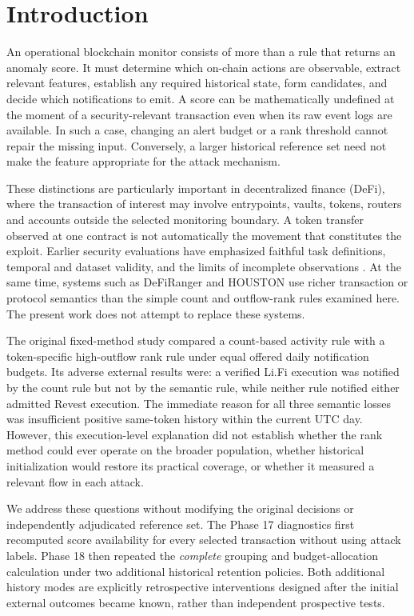 \documentclass[preprint,12pt,authoryear]{elsarticle}
\begin{document}
\section{Introduction}\label{introduction}

An operational blockchain monitor consists of more than a rule that returns an anomaly score. It must determine which on-chain actions are observable, extract relevant features, establish any required historical state, form candidates, and decide which notifications to emit. A score can be mathematically undefined at the moment of a security-relevant transaction even when its raw event logs are available. In such a case, changing an alert budget or a rank threshold cannot repair the missing input. Conversely, a larger historical reference set need not make the feature appropriate for the attack mechanism.

These distinctions are particularly important in decentralized finance (DeFi), where the transaction of interest may involve entrypoints, vaults, tokens, routers and accounts outside the selected monitoring boundary. A token transfer observed at one contract is not automatically the movement that constitutes the exploit. Earlier security evaluations have emphasized faithful task definitions, temporal and dataset validity, and the limits of incomplete observations \citep{Sommer2010ClosedWorld,Arp2022Dons}. At the same time, systems such as DeFiRanger and HOUSTON use richer transaction or protocol semantics than the simple count and outflow-rank rules examined here. The present work does not attempt to replace these systems.

The original fixed-method study compared a count-based activity rule with a token-specific high-outflow rank rule under equal offered daily notification budgets. Its adverse external results were: a verified Li.Fi execution was notified by the count rule but not by the semantic rule, while neither rule notified either admitted Revest execution. The immediate reason for all three semantic losses was insufficient positive same-token history within the current UTC day. However, this execution-level explanation did not establish whether the rank method could ever operate on the broader population, whether historical initialization would restore its practical coverage, or whether it measured a relevant flow in each attack.

We address these questions without modifying the original decisions or independently adjudicated reference set. The Phase 17 diagnostics first recomputed score availability for every selected transaction without using attack labels. Phase 18 then repeated the \emph{complete} grouping and budget-allocation calculation under two additional historical retention policies. Both additional history modes are explicitly retrospective interventions designed after the initial external outcomes became known, rather than independent prospective tests.
\end{document}
